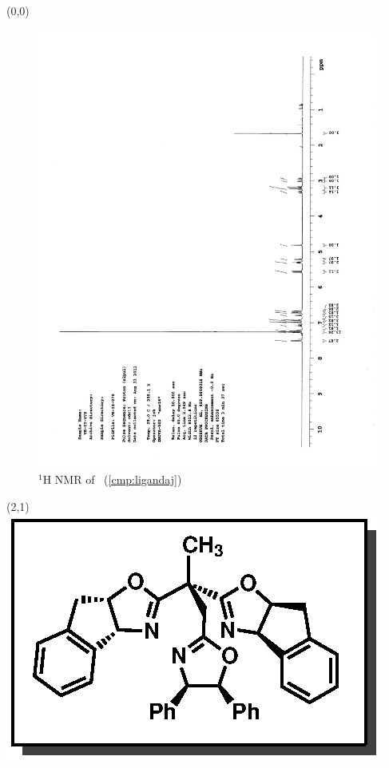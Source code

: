 \begin{textblock}{20}(0,0)
\begin{figure}[htb]
\caption{$^1$H NMR of \CMPligandaj\ (\ref{cmp:ligandaj})}
\includegraphics[scale=0.75, trim = 0mm 0mm 0mm 5mm,
clip]{chp_asymmetric/images/nmr/ligandajH}
\vspace{-100pt}
\end{figure}
\end{textblock}
\begin{textblock}{1}(2,1)
\includegraphics[scale=0.8, angle=90]{chp_asymmetric/images/ligandaj}
\end{textblock}
